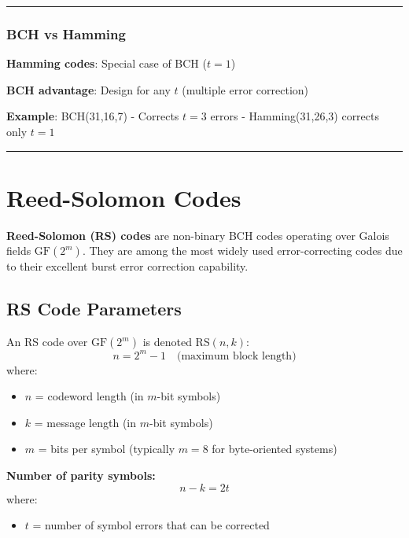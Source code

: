 \begin{center}\rule{0.5\linewidth}{0.5pt}\end{center}

\subsubsection{BCH vs Hamming}\label{bch-vs-hamming}

\textbf{Hamming codes}: Special case of BCH (\(t = 1\))

\textbf{BCH advantage}: Design for any \(t\) (multiple error correction)

\textbf{Example}: BCH(31,16,7) - Corrects \(t = 3\) errors -
Hamming(31,26,3) corrects only \(t = 1\)

\begin{center}\rule{0.5\linewidth}{0.5pt}\end{center}

\section{Reed-Solomon Codes}\label{reed-solomon-codes}

\textbf{Reed-Solomon (RS) codes} are non-binary BCH codes operating over Galois fields $\mathrm{GF}(2^m)$. They are among the most widely used error-correcting codes due to their excellent burst error correction capability.

\subsection{RS Code Parameters}

An RS code over $\mathrm{GF}(2^m)$ is denoted RS$(n,k)$:
\begin{equation}
n = 2^m - 1 \quad \text{(maximum block length)}
\end{equation}
where:
\begin{itemize}
\item $n$ = codeword length (in $m$-bit symbols)
\item $k$ = message length (in $m$-bit symbols)
\item $m$ = bits per symbol (typically $m = 8$ for byte-oriented systems)
\end{itemize}

\textbf{Number of parity symbols:}
\begin{equation}
n - k = 2t
\end{equation}
where:
\begin{itemize}
\item $t$ = number of symbol errors that can be corrected
\end{itemize}

